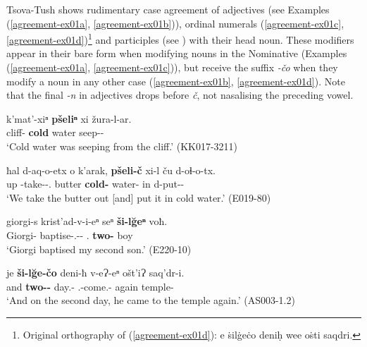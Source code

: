 Tsova-Tush shows rudimentary case agreement of adjectives (see Examples (\ref{agreement-ex01a}, \ref{agreement-ex01b})), ordinal numerals (\ref{agreement-ex01c}, \ref{agreement-ex01d})\footnote{Original orthography of (\ref{agreement-ex01d}): e \.{s}il\.{g}e\.{c}o deniḥ wee o\.{s}ti saqdri.} and participles (see ) with their head noun. These modifiers appear in their bare form when modifying nouns in the Nominative (Examples (\ref{agreement-ex01a}, \ref{agreement-ex01c})), but receive the suffix \textit{-čo} when they modify a noun in any other case (\ref{agreement-ex01b}, \ref{agreement-ex01d}). Note that the final \textit{-n} in adjectives drops before \textit{č}, not nasalising the preceding vowel.

\begin{exe}
	\ex\label{agreement-ex01}
	\begin{xlist}
		
		\ex\label{agreement-ex01a}
		\gll k'mat'-xiⁿ \textbf{pšeliⁿ} xi žura-l-ar.\\
		cliff-{\Apudabl} \textbf{cold} water seep-{\Intr}-{\Imprf}\\
		\trans `Cold water was seeping from the cliff.'
		\hfill (KK017-3211)
		
		\ex\label{agreement-ex01b}
		\gll ħal d-aq-o-etx o k'arak, \textbf{pšeli-č} xi-l ču d-oɬ-o-tx.\\
		up {\D}-take-{\Npst}-{\Fpl}.{\Erg} {\Dist} butter \textbf{cold-{\Obl}} water-{\Interlat} in d-put-{\Npst}-{\Fpl}\\
		\trans `We take the butter out [and] put it in cold water.'
		\hfill (E019-80)
		
		\ex\label{agreement-ex01c}
		\gll giorgi-s krist'ad-v-i-eⁿ seⁿ \textbf{ši-l\u{g}eⁿ} voħ.\\
		Giorgi-{\Erg} baptise-{\M}.{\Sg}-{\Tr}-{\Aor} {\Fsg}.{\Gen} \textbf{two-{\Ord}} boy\\
		\trans `Giorgi baptised my second son.'
		\hfill (E220-10)
		
		\ex\label{agreement-ex01d}
		\gll je \textbf{ši-l\u{g}e-čo} deni-ħ v-eɁ-eⁿ ošt'iɁ saq'dr-i.\\
		and \textbf{two-{\Ord}-{\Obl}} day.{\Obl}-{\Ess} {\M}.{\Sg}-come.{\Ipfv}-{\Aor} again temple-{\Ill}\\
		\trans `And on the second day, he came to the temple again.'
		\hfill (AS003-1.2)  
	\end{xlist}
\end{exe}


